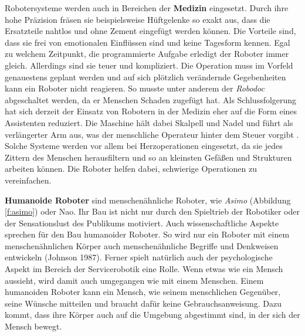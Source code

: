 Robotersysteme werden auch in Bereichen der \textbf{Medizin} eingesetzt. Durch ihre hohe Präzision fräsen sie beispielsweise Hüftgelenke so exakt aus, dass die Ersatzteile nahtlos und ohne Zement eingefügt werden können. Die Vorteile sind, dass sie frei von emotionalen Einflüssen sind und keine Tagesform kennen. Egal zu welchem Zeitpunkt, die programmierte Aufgabe erledigt der Roboter immer gleich. Allerdings sind sie teuer und kompliziert. Die Operation muss im Vorfeld genauestens geplant werden und auf sich plötzlich verändernde Gegebenheiten kann ein Roboter nicht reagieren. So musste unter anderem der \textit{Robodoc} abgeschaltet werden, da er Menschen Schaden zugefügt hat. Als Schlussfolgerung hat sich derzeit der Einsatz von Robotern in der Medizin eher auf die Form eines Assistenten reduziert. Die Maschine hält dabei Skalpell und Nadel und führt als verlängerter Arm aus, was der menschliche Operateur hinter dem Steuer vorgibt \cite{Haun2007}. Solche Systeme werden vor allem bei Herzoperationen eingesetzt, da sie jedes Zittern des Menschen herausfiltern und so an kleinsten Gefäßen und Strukturen arbeiten können. Die Roboter helfen dabei, schwierige Operationen zu vereinfachen.

\textbf{Humanoide Roboter} sind menschenähnliche Roboter, wie \textit{Asimo} (Abbildung \ref{f:asimo}) oder Nao. Ihr Bau ist nicht nur durch den Spieltrieb der Robotiker oder der Sensationslust des Publikums motiviert. Auch wissenschaftliche Aspekte sprechen für den Bau humanoider Roboter. So wird nur ein Roboter mit einem menschenähnlichen Körper auch menschenähnliche Begriffe und Denkweisen entwickeln (Johnson 1987). Ferner spielt natürlich auch der psychologische Aspekt im Bereich der Servicerobotik eine Rolle. Wenn etwas wie ein Mensch aussieht, wird damit auch umgegangen wie mit einem Menschen. Einem humanoiden Roboter kann ein Mensch, wie seinem menschlichen Gegenüber, seine Wünsche mitteilen und braucht dafür keine Gebrauchsanweisung. Dazu kommt, dass ihre Körper auch auf die Umgebung abgestimmt sind, in der sich der Mensch bewegt.


